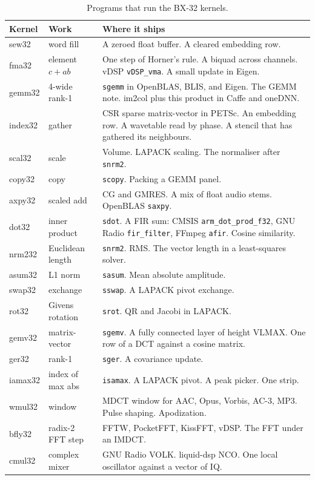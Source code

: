 \begin{table}[htbp]
\centering
\caption{Programs that run the BX-32 kernels.}
\begingroup
\scriptsize
\setlength{\tabcolsep}{3pt}
\begin{tabular}{@{}llp{7.0cm}@{}}
\toprule
Kernel & Work & Where it ships \\
\midrule
sew32 & word fill & A zeroed float buffer. A cleared embedding row. \\
fma32 & element $c + ab$ & One step of Horner's rule. A biquad across channels. vDSP \texttt{vDSP\_vma}. A small update in Eigen. \\
gemm32 & 4-wide rank-1 & \texttt{sgemm} in OpenBLAS, BLIS, and Eigen. The GEMM note. im2col plus this product in Caffe and oneDNN. \\
index32 & gather & CSR sparse matrix-vector in PETSc. An embedding row. A wavetable read by phase. A stencil that has gathered its neighbours. \\
scal32 & scale & Volume. LAPACK scaling. The normaliser after \texttt{snrm2}. \\
copy32 & copy & \texttt{scopy}. Packing a GEMM panel. \\
axpy32 & scaled add & CG and GMRES. A mix of float audio stems. OpenBLAS \texttt{saxpy}. \\
dot32 & inner product & \texttt{sdot}. A FIR sum: CMSIS \texttt{arm\_dot\_prod\_f32}, GNU Radio \texttt{fir\_filter}, FFmpeg \texttt{afir}. Cosine similarity. \\
nrm232 & Euclidean length & \texttt{snrm2}. RMS. The vector length in a least-squares solver. \\
asum32 & L1 norm & \texttt{sasum}. Mean absolute amplitude. \\
swap32 & exchange & \texttt{sswap}. A LAPACK pivot exchange. \\
rot32 & Givens rotation & \texttt{srot}. QR and Jacobi in LAPACK. \\
gemv32 & matrix-vector & \texttt{sgemv}. A fully connected layer of height VLMAX. One row of a DCT against a cosine matrix. \\
ger32 & rank-1 & \texttt{sger}. A covariance update. \\
iamax32 & index of max abs & \texttt{isamax}. A LAPACK pivot. A peak picker. One strip. \\
wmul32 & window & MDCT window for AAC, Opus, Vorbis, AC-3, MP3. Pulse shaping. Apodization. \\
bfly32 & radix-2 FFT step & FFTW, PocketFFT, KissFFT, vDSP. The FFT under an IMDCT. \\
cmul32 & complex mixer & GNU Radio VOLK. liquid-dsp NCO. One local oscillator against a vector of IQ. \\
\bottomrule
\end{tabular}
\endgroup
\end{table}

